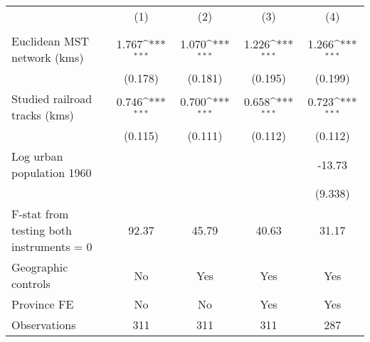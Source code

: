 {
\def\sym#1{\ifmmode^{#1}\else\(^{#1}\)\fi}
\begin{tabular}{l*{4}{c}}
\hline\hline
                &\multicolumn{1}{c}{(1)}&\multicolumn{1}{c}{(2)}&\multicolumn{1}{c}{(3)}&\multicolumn{1}{c}{(4)}\\
                &\multicolumn{1}{c}{}&\multicolumn{1}{c}{}&\multicolumn{1}{c}{}&\multicolumn{1}{c}{}\\
\hline
Euclidean MST network (kms)&    1.767\sym{***}&    1.070\sym{***}&    1.226\sym{***}&    1.266\sym{***}\\
                &  (0.178)         &  (0.181)         &  (0.195)         &  (0.199)         \\
[1em]
Studied railroad tracks (kms)&    0.746\sym{***}&    0.700\sym{***}&    0.658\sym{***}&    0.723\sym{***}\\
                &  (0.115)         &  (0.111)         &  (0.112)         &  (0.112)         \\
[1em]
Log urban population 1960&                  &                  &                  &   -13.73         \\
                &                  &                  &                  &  (9.338)         \\
\hline
F-stat from testing both instruments = 0&    92.37         &    45.79         &    40.63         &    31.17         \\
Geographic controls&       No         &      Yes         &      Yes         &      Yes         \\
Province FE     &       No         &       No         &      Yes         &      Yes         \\
Observations    &      311         &      311         &      311         &      287         \\
\hline\hline
\end{tabular}
}
